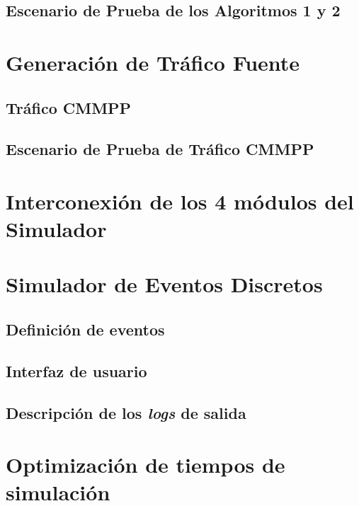 \subsection{Escenario de Prueba de los Algoritmos 1 y 2}




\section{Generación de Tráfico Fuente}

\subsection{Tráfico CMMPP}
\subsection{Escenario de Prueba de Tráfico CMMPP}


\section{Interconexión de los 4 módulos del Simulador}


\section{Simulador de Eventos Discretos}

\subsection{Definición de eventos}

\subsection{Interfaz de usuario}

\subsection{Descripción de los \textit{logs} de salida}


\section{Optimización de tiempos de simulación}
